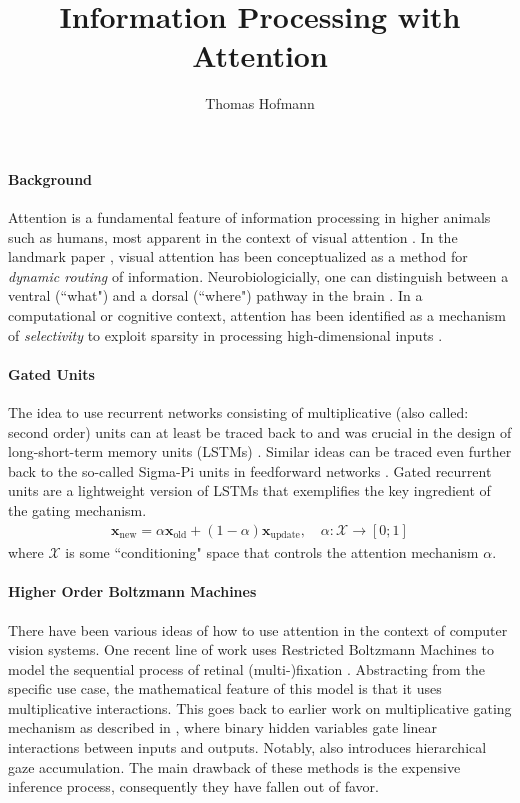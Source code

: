 \documentclass{article}
\title{Information Processing with Attention}
\author{Thomas Hofmann}
\newcommand{\x}{{\mathbf x}}
\begin{document}
\maketitle 

\paragraph{Background} Attention \cite{treisman1980feature} is a fundamental feature of information processing in higher animals such as humans, most apparent in the context of visual attention \cite{bergen1983parallel}. In the landmark paper \cite{olshausen1993neurobiological}, visual attention has been conceptualized as a method for \textit{dynamic routing} of information. Neurobiologicially, one can distinguish between a ventral (``what") and a dorsal (``where") pathway in the brain \cite{goodale1992separate}. In a computational or cognitive context, attention has been identified as a mechanism of \textit{selectivity} to exploit sparsity in processing high-dimensional inputs \cite{gershman2010learning}.


\paragraph{Gated Units} The idea to use recurrent networks consisting of multiplicative (also called: second order) units  can at least be traced back to \cite{watrous1992induction} and was crucial in the design of long-short-term memory units (LSTMs) \cite{hochreiter1997long}. Similar ideas can be traced even further back to the so-called Sigma-Pi units in feedforward networks \cite{williams1986logic,feldman1982connectionist}. Gated recurrent units \cite{chung2015gated} are a lightweight version of LSTMs that exemplifies the key ingredient of the gating mechanism.
\begin{align}
\x_{\text{new}} = \alpha \x_{\text{old}} + (1-\alpha) \x_{\text{update}}, \quad \alpha : \mathcal X \to [0;1]
\end{align}
where $\mathcal X$ is some ``conditioning" space that controls the attention mechanism $\alpha$. 


\paragraph{Higher Order Boltzmann Machines} There have been various ideas of how to use attention in the context of computer vision systems. One recent line of work uses Restricted Boltzmann Machines to model the sequential process of retinal (multi-)fixation \cite{larochelle2010learning, denil2012learning}. Abstracting from the specific use case, the mathematical feature of this model is that it uses multiplicative interactions. This goes back to earlier work on multiplicative gating mechanism as described in  \cite{memisevic2007unsupervised}, where binary hidden variables gate linear interactions between inputs and outputs. Notably, \cite{denil2012learning} also introduces hierarchical gaze accumulation. The main drawback of these methods is the expensive inference process, consequently they have fallen out of favor. 
\end{document}
